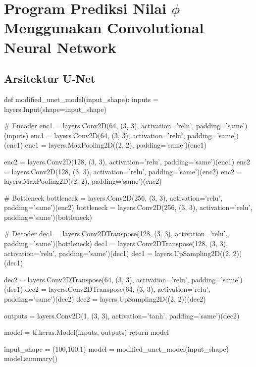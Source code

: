 \chapter{Program Prediksi Nilai $\phi$ Menggunakan Convolutional Neural Network}
\section{Arsitektur U-Net}\label{unies_og}
\begin{lampiranpythoncode}
def modified_unet_model(input_shape):
  inputs = layers.Input(shape=input_shape)

  # Encoder
  enc1 = layers.Conv2D(64, (3, 3), activation='relu', padding='same')(inputs)
  enc1 = layers.Conv2D(64, (3, 3), activation='relu', padding='same')(enc1)
  enc1 = layers.MaxPooling2D((2, 2), padding='same')(enc1)

  enc2 = layers.Conv2D(128, (3, 3), activation='relu', padding='same')(enc1)
  enc2 = layers.Conv2D(128, (3, 3), activation='relu', padding='same')(enc2)
  enc2 = layers.MaxPooling2D((2, 2), padding='same')(enc2)

  # Bottleneck
  bottleneck = layers.Conv2D(256, (3, 3), activation='relu', padding='same')(enc2)
  bottleneck = layers.Conv2D(256, (3, 3), activation='relu', padding='same')(bottleneck)

  # Decoder
  dec1 = layers.Conv2DTranspose(128, (3, 3), activation='relu', padding='same')(bottleneck)
  dec1 = layers.Conv2DTranspose(128, (3, 3), activation='relu', padding='same')(dec1)
  dec1 = layers.UpSampling2D((2, 2))(dec1)

  dec2 = layers.Conv2DTranspose(64, (3, 3), activation='relu', padding='same')(dec1)
  dec2 = layers.Conv2DTranspose(64, (3, 3), activation='relu', padding='same')(dec2)
  dec2 = layers.UpSampling2D((2, 2))(dec2)

  outputs = layers.Conv2D(1, (3, 3), activation='tanh', padding='same')(dec2)

  model = tf.keras.Model(inputs, outputs)
  return model

input_shape = (100,100,1)
model = modified_unet_model(input_shape)
model.summary()
\end{lampiranpythoncode}

